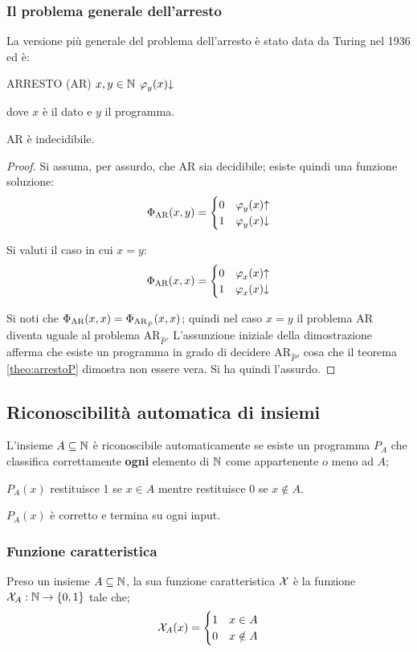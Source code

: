 \subsubsection*{Il problema generale dell'arresto}
La versione più generale del problema dell'arresto è stato data da Turing nel 1936 ed è:
\begin{center}
    \problema
    {ARRESTO (AR)}
    {$x,y\in\N$}
    {$\semRAM_y(x)\termina$}
\end{center}
dove $x$ è il dato e $y$ il programma.
\begin{theorem}[Indecibilità di AR]
    AR è indecidibile.
\end{theorem}
\begin{proof}
    Si assuma, per assurdo, che AR sia decidibile; esiste quindi una funzione soluzione:
    $$ \fsol[\text{AR}](x,y) = \begin{cases}
        0 & \semRAM_y(x)\text{\textuparrow}\\
        1 & \semRAM_y(x)\termina
    \end{cases} $$

    Si valuti il caso in cui $x=y$:
    $$ \fsol[\text{AR}](x,x) = \begin{cases}
        0 & \semRAM_x(x)\text{\textuparrow}\\
        1 & \semRAM_x(x)\termina
    \end{cases} $$

    Si noti che $\fsol[\text{AR}](x,x)=\fsol[\text{AR}_{\hat{P}}](x,x)$; quindi nel caso
    $x=y$ il problema AR diventa uguale al problema $\text{AR}_{\hat{P}}$. L'assunzione
    iniziale della dimostrazione afferma che esiste un programma in grado di decidere
    $\text{AR}_{\hat{P}}$, cosa che il teorema \ref{theo:arrestoP} dimostra non essere vera.
    Si ha quindi l'assurdo.
\end{proof}

\subsection{Riconoscibilità automatica di insiemi}
L'insieme $A\subseteq\N$ è riconoscibile automaticamente se esiste un programma $P_A$
che classifica correttamente \textbf{ogni} elemento di $\N$ come appartenente o meno 
ad $A$;

$P_A(x)$ restituisce 1 se $x\in A$ mentre restituisce 0 se $x\notin A$. 

$P_A(x)$ è corretto e termina su ogni input.

\subsubsection*{Funzione caratteristica}
Preso un insieme $A\subseteq\N$, la sua funzione caratteristica $\X$ è la funzione 
$\X_A:\N\to\{0,1\}$ tale che;
$$ \X_A(x)=\begin{cases}
    1 & x\in A\\
    0 & x\notin A
\end{cases} $$

